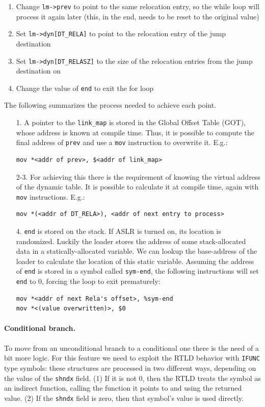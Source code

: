 \documentclass[11pt,twoside,a4paper]{article}
\begin{document}
\begin{enumerate}
\item Change \texttt{lm->prev} to point to the same relocation entry, so the while loop will process it again later (this, in the end, needs to be reset to the original value)
\item Set \texttt{lm->dyn[DT\_RELA]} to point to the relocation entry of the jump destination
\item Set \texttt{lm->dyn[DT\_RELASZ]} to the size of the relocation entries from the jump destination on
\item Change the value of \texttt{end} to exit the for loop
\end{enumerate}


The following summarizes the process needed to achieve each point.

\begin{itemize}
  \item[1.] A pointer to the \texttt{link\_map} is stored in the Global Offset Table (GOT), whose address is known at compile time. Thus, it is possible to compute the final address of \texttt{prev} and use a \texttt{mov} instruction to overwrite it. E.g.:
  \begin{lstlisting}
mov *<addr of prev>, $<addr of link_map>
  \end{lstlisting}
  \item[2-3.] For achieving this there is the requirement of knowing the virtual address of the dynamic table. It is possible to calculate it at compile time, again with \texttt{mov} instructions. E.g.:
  \begin{lstlisting}
mov *(<addr of DT_RELA>), <addr of next entry to process>
  \end{lstlisting}
  \item[4.] \texttt{end} is stored on the stack. If ASLR is turned on, its location is randomized. Luckily the loader stores the address of some stack-allocated data in a statically-allocated variable. We can lookup the base-address of the loader to calculate the location of this static variable. Assuming the
address of \texttt{end} is stored in a symbol called \texttt{sym-end}, the following instructions will set \texttt{end} to 0, forcing the loop to exit prematurely:
 \begin{lstlisting}
mov *<addr of next Rela's offset>, %sym-end
mov *<(value overwritten)>, $0
 \end{lstlisting}
\end{itemize}

\paragraph{Conditional branch.} To move from an unconditional branch to a conditional one there is the need of a bit more logic. For this feature we need to exploit the RTLD behavior with \texttt{IFUNC} type symbols: these structures are processed in two different ways, depending on the value of the \texttt{shndx} field. (1) If it is not 0, then the RTLD treats the symbol as an indirect function, calling the function it points to and using the returned value. (2) If the \texttt{shndx} field is zero, then that symbol's value is used directly.
\end{document}
